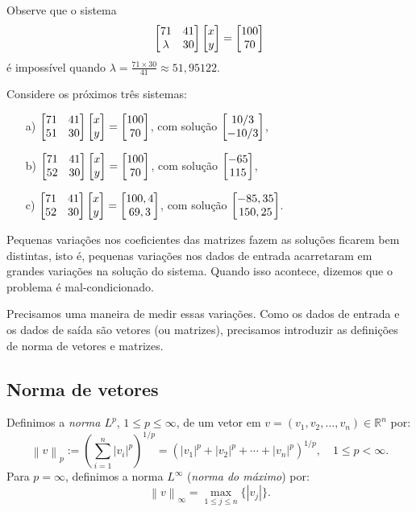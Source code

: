 \begin{ex} Observe que o sistema
\begin{equation}
\begin{bmatrix} 71&41\\\lambda&30 \end{bmatrix}\begin{bmatrix} x \\y \end{bmatrix}=\begin{bmatrix} 100 \\70 \end{bmatrix}
\end{equation}
é impossível quando $\lambda= \frac{71\times 30}{41}\approx 51,95122$.

Considere os próximos três sistemas:
\begin{enumerate}
 \item [a)] $\begin{bmatrix} 71&41\\51&30 \end{bmatrix}\begin{bmatrix} x \\y \end{bmatrix}=\begin{bmatrix} 100 \\70 \end{bmatrix}$, com solução $\begin{bmatrix} 10/3 \\-10/3 \end{bmatrix}$,
 \item [b)] $\begin{bmatrix} 71&41\\52&30 \end{bmatrix}\begin{bmatrix} x \\y \end{bmatrix}=\begin{bmatrix} 100 \\70 \end{bmatrix}$, com solução $\begin{bmatrix} -65 \\115 \end{bmatrix}$,
 \item [c)] $\begin{bmatrix} 71&41\\52&30 \end{bmatrix}\begin{bmatrix} x \\y \end{bmatrix}=\begin{bmatrix} 100,4 \\69,3 \end{bmatrix}$, com solução $\begin{bmatrix} -85,35 \\150,25 \end{bmatrix}$.
\end{enumerate}

Pequenas variações nos coeficientes das matrizes fazem as soluções ficarem bem distintas, isto é, pequenas variações nos dados de entrada acarretaram em grandes variações na solução do sistema. Quando isso acontece, dizemos que o problema é mal-condicionado.
\end{ex}

Precisamos uma maneira de medir essas variações. Como os dados de entrada e os dados de saída são vetores (ou matrizes), precisamos introduzir as definições de norma de vetores e matrizes.

\subsection{Norma de vetores}

Definimos a \emph{norma $L^p$}, $1 \leq p \leq \infty$, de um vetor em $v = (v_1, v_2, \ldots, v_n)\in \mathbb{R}^n$ por:
\begin{equation*}
  \left\|v\right\|_p := \left(\sum_{i=1}^n \left |v_i\right |^p\right)^{1/p} = \left(\left |v_1\right |^p+\left |v_2\right |^p+ \cdots +\left |v_n\right |^p\right)^{1/p},\quad 1\leq p < \infty.
\end{equation*}
Para $p=\infty$, definimos a norma $L^{\infty}$ (\emph{norma do máximo}) por:
\begin{equation*}
  \left\|v\right\|_\infty = \max_{1\leq j\leq n} \{\left |v_j\right |\}.
\end{equation*}

